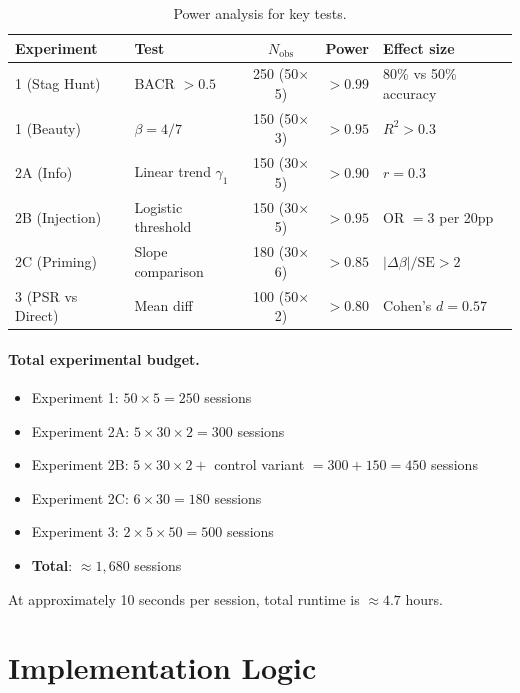 \documentclass[12pt]{article}
\begin{document}
\begin{table}[h]
\centering
\caption{Power analysis for key tests.}
\label{tab:power}
\begin{tabular}{@{}llccl@{}}
\toprule
Experiment & Test & $N_{\text{obs}}$ & Power & Effect size \\
\midrule
1 (Stag Hunt) & BACR $> 0.5$ & 250 (50$\times$5) & $> 0.99$ & 80\% vs 50\% accuracy \\
1 (Beauty) & $\beta = 4/7$ & 150 (50$\times$3) & $> 0.95$ & $R^2 > 0.3$ \\
2A (Info) & Linear trend $\gamma_1$ & 150 (30$\times$5) & $> 0.90$ & $r = 0.3$ \\
2B (Injection) & Logistic threshold & 150 (30$\times$5) & $> 0.95$ & OR $= 3$ per 20pp \\
2C (Priming) & Slope comparison & 180 (30$\times$6) & $> 0.85$ & $|\Delta\beta| / \text{SE} > 2$ \\
3 (PSR vs Direct) & Mean diff & 100 (50$\times$2) & $> 0.80$ & Cohen's $d = 0.57$ \\
\bottomrule
\end{tabular}
\end{table}

\paragraph{Total experimental budget.}
\begin{itemize}[nosep]
    \item Experiment 1: $50 \times 5 = 250$ sessions
    \item Experiment 2A: $5 \times 30 \times 2 = 300$ sessions
    \item Experiment 2B: $5 \times 30 \times 2 + $ control variant $= 300 + 150 = 450$ sessions
    \item Experiment 2C: $6 \times 30 = 180$ sessions
    \item Experiment 3: $2 \times 5 \times 50 = 500$ sessions
    \item \textbf{Total}: $\approx 1{,}680$ sessions
\end{itemize}

At approximately 10 seconds per session, total runtime is $\approx 4.7$ hours.


\section{Implementation Logic}
\label{sec:implementation}
\end{document}
